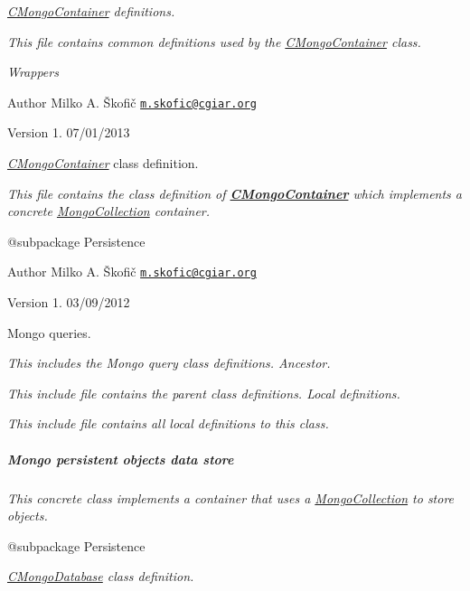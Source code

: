 {\itshape \hyperlink{class_c_mongo_container}{C\-Mongo\-Container} definitions.}

{\itshape This file contains common definitions used by the \hyperlink{class_c_mongo_container}{C\-Mongo\-Container} class.}

{\itshape  Wrappers}

{\itshape \begin{DoxyAuthor}{Author}
Milko A. Škofič \href{mailto:m.skofic@cgiar.org}{\tt m.\-skofic@cgiar.\-org} 
\end{DoxyAuthor}
\begin{DoxyVersion}{Version}
1. 07/01/2013
\end{DoxyVersion}
{\itshape \hyperlink{class_c_mongo_container}{C\-Mongo\-Container}} class definition.}

{\itshape This file contains the class definition of {\bfseries \hyperlink{class_c_mongo_container}{C\-Mongo\-Container}} which implements a concrete \hyperlink{}{Mongo\-Collection} container.}

{\itshape \begin{DoxyVerb} @subpackage        Persistence
\end{DoxyVerb}
}

{\itshape \begin{DoxyAuthor}{Author}
Milko A. Škofič \href{mailto:m.skofic@cgiar.org}{\tt m.\-skofic@cgiar.\-org} 
\end{DoxyAuthor}
\begin{DoxyVersion}{Version}
1. 03/09/2012
\end{DoxyVersion}
Mongo queries.}

{\itshape This includes the Mongo query class definitions. Ancestor.}

{\itshape This include file contains the parent class definitions. Local definitions.}

{\itshape This include file contains all local definitions to this class. \subparagraph*{Mongo persistent objects data store}}

{\itshape }

{\itshape This {\itshape concrete} class implements a container that uses a \hyperlink{}{Mongo\-Collection} to store objects.}

{\itshape \begin{DoxyVerb} @subpackage        Persistence\end{DoxyVerb}
}

{\itshape {\itshape \hyperlink{class_c_mongo_database}{C\-Mongo\-Database}} class definition.}

